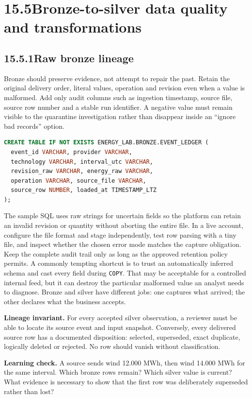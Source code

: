 \documentclass[11pt,twoside]{article}
\newcommand{\topic}[2]{\subsection*{#1\quad #2}}
\begin{document}
\newpage

\section*{15.5\quad Bronze-to-silver data quality and transformations}
\topic{15.5.1}{Raw bronze lineage}
Bronze should preserve evidence, not attempt to repair the past. Retain the original delivery order, literal values, operation and revision even when a value is malformed. Add only audit columns such as ingestion timestamp, source file, source row number and a stable run identifier. A negative value must remain visible to the quarantine investigation rather than disappear inside an ``ignore bad records'' option.
\begin{lstlisting}[language=SQL]
CREATE TABLE IF NOT EXISTS ENERGY_LAB.BRONZE.EVENT_LEDGER (
  event_id VARCHAR, provider VARCHAR,
  technology VARCHAR, interval_utc VARCHAR,
  revision_raw VARCHAR, energy_raw VARCHAR,
  operation VARCHAR, source_file VARCHAR,
  source_row NUMBER, loaded_at TIMESTAMP_LTZ
);
\end{lstlisting}
The sample SQL uses raw strings for uncertain fields so the platform can retain an invalid revision or quantity without aborting the entire file. In a live account, configure the file format and stage independently, test row parsing with a tiny file, and inspect whether the chosen error mode matches the capture obligation. Keep the complete audit trail only as long as the approved retention policy permits.
A commonly tempting shortcut is to trust an automatically inferred schema and cast every field during \texttt{COPY}. That may be acceptable for a controlled internal feed, but it can destroy the particular malformed value an analyst needs to diagnose. Bronze and silver have different jobs: one captures what arrived; the other declares what the business accepts.
\begin{whitebox}\textbf{Lineage invariant.} For every accepted silver observation, a reviewer must be able to locate its source event and input snapshot. Conversely, every delivered source row has a documented disposition: selected, superseded, exact duplicate, logically deleted or rejected. No row should vanish without classification.\end{whitebox}
\textbf{Learning check.} A source sends wind 12.000 MWh, then wind 14.000 MWh for the same interval. Which bronze rows remain? Which silver value is current? What evidence is necessary to show that the first row was deliberately superseded rather than lost?
\end{document}
